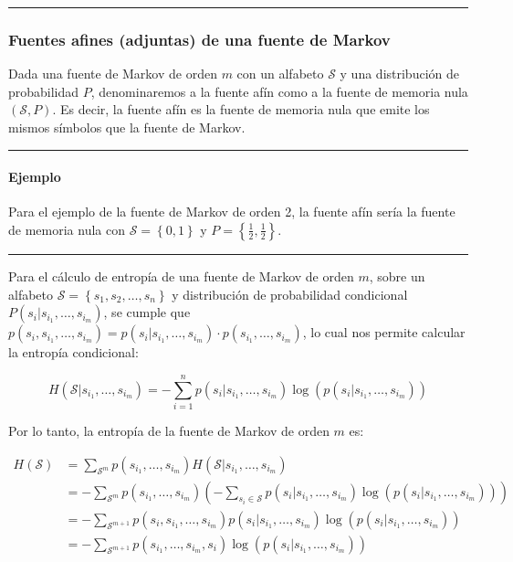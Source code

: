 \begin{center}\rule{0.5\linewidth}{0.5pt}\end{center}

\subsubsection{Fuentes afines (adjuntas) de una fuente de
Markov}\label{fuentes-afines-adjuntas-de-una-fuente-de-markov}

Dada una fuente de Markov de orden \(m\) con un alfabeto \(\mathcal{S}\)
y una distribución de probabilidad \(P\), denominaremos a la fuente afín
como a la fuente de memoria nula \((\mathcal{S},P)\). Es decir, la
fuente afín es la fuente de memoria nula que emite los mismos símbolos
que la fuente de Markov.

\begin{center}\rule{0.5\linewidth}{0.5pt}\end{center}

\paragraph{Ejemplo}\label{ejemplo-2}

Para el ejemplo de la fuente de Markov de orden 2, la fuente afín sería
la fuente de memoria nula con \(\mathcal{S}=\left\{0,1\right\}\) y
\(P=\left\{\frac{1}{2},\frac{1}{2}\right\}\).

\begin{center}\rule{0.5\linewidth}{0.5pt}\end{center}

Para el cálculo de entropía de una fuente de Markov de orden \(m\),
sobre un alfabeto \(\mathcal{S}=\left\{s_1,s_2,\dots,s_n\right\}\) y
distribución de probabilidad condicional
\(P(s_i|s_{i_1},\dots,s_{i_m})\), se cumple que
\(p(s_i, s_{i_1},\dots,s_{i_m}) = p(s_i|s_{i_1},\dots,s_{i_m})\cdot p(s_{i_1},\dots,s_{i_m})\),
lo cual nos permite calcular la entropía condicional:

\[
H(\mathcal{S}|s_{i_1},\dots,s_{i_m}) = -\sum_{i=1}^{n}p(s_i|s_{i_1},\dots,s_{i_m})\log\left(p(s_i|s_{i_1},\dots,s_{i_m})\right)
\]

Por lo tanto, la entropía de la fuente de Markov de orden \(m\) es:


\begin{align*}
H(\mathcal{S}) &= \sum_{\mathcal{S}^m}p(s_{i_1},\dots,s_{i_m})H(\mathcal{S}|s_{i_1},\dots,s_{i_m})\\
&= -\sum_{\mathcal{S}^m}p(s_{i_1},\dots,s_{i_m})\left(-\sum_{s_i\in\mathcal{S}}p(s_i|s_{i_1},\dots,s_{i_m})\log\left(p(s_i|s_{i_1},\dots,s_{i_m})\right)\right)\\
&= -\sum_{\mathcal{S}^{m+1}}p(s_i, s_{i_1},\dots,s_{i_m})p(s_i|s_{i_1},\dots,s_{i_m})\log\left(p(s_i|s_{i_1},\dots,s_{i_m})\right)\\
&= -\sum_{\mathcal{S}^{m+1}}p(s_{i_1},\dots,s_{i_m},s_i)\log\left(p(s_i|s_{i_1},\dots,s_{i_m})\right)\\
\end{align*}

